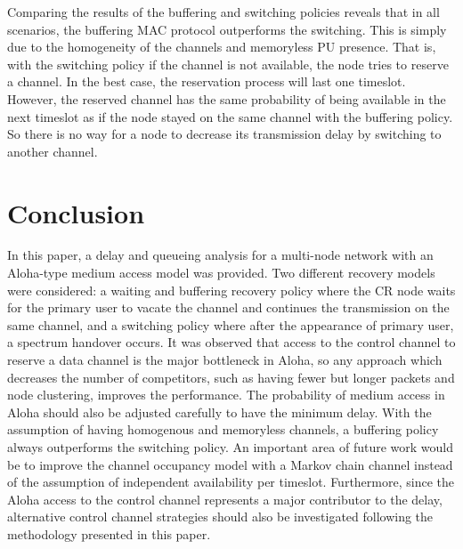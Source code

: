 \documentclass[12pt,journal,oneside,onecolumn]{IEEEtran}
\begin{document}
Comparing the results of the buffering and switching 
policies reveals that in all  scenarios, the buffering 
MAC protocol outperforms the switching. 
This is simply due to the homogeneity of the channels and memoryless
PU presence. That is, with the switching policy if the channel is not available,
the node tries to reserve a channel. In the best case, the reservation process
will last one timeslot. However, the reserved
channel has the same probability of being available in the next timeslot as if
the node stayed on the same channel with the buffering policy.
So there is no way for a node to decrease its transmission delay
by switching to another channel.


\section{Conclusion}
\label{sec:conclusion}
In this paper, a delay and queueing analysis for a multi-node network with an 
Aloha-type medium access model was provided. Two different recovery models 
were considered: a waiting and buffering recovery policy where the CR node 
waits for the primary user to vacate the channel and continues the transmission 
on the same channel, and a switching policy where after the appearance of 
primary user, a spectrum handover occurs. It was observed that access to 
the control channel to reserve a data channel is the major bottleneck in Aloha, 
so any approach which decreases the number of competitors, 
such as having fewer but longer packets and node clustering, improves the performance. 
The probability of medium access in Aloha should also be adjusted carefully
to have the minimum delay. With the assumption of having homogenous and 
memoryless channels, a buffering policy always outperforms the switching policy. 
An important area of future work would be to improve the channel occupancy model with a 
Markov chain channel instead of the assumption of independent 
availability per timeslot. Furthermore, since the Aloha access to the control channel represents
a major contributor to the delay, alternative control channel strategies should also be investigated following 
the methodology presented in this paper.



\end{document}
